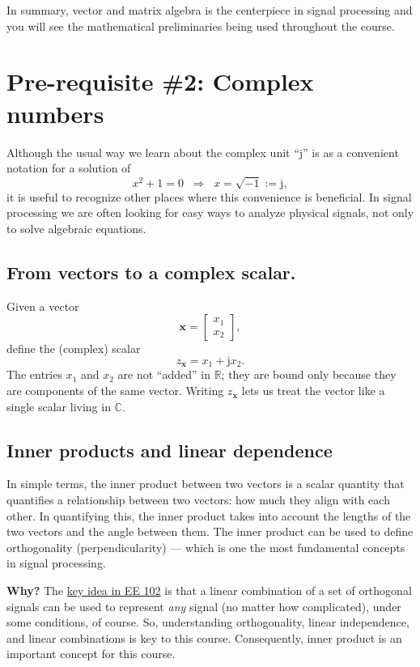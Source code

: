 \documentclass{ee102_notes}
\begin{document}
In summary, vector and matrix algebra is the centerpiece in signal processing and you will see the mathematical preliminaries being used throughout the course.
\section{Pre-requisite \#2: Complex numbers}

Although the usual way we learn about the complex unit ``$\mathrm{j}$'' is as
a convenient notation for a solution of
\[
x^{2}+1=0 \;\;\Rightarrow\;\; x=\sqrt{-1}:=\mathrm{j},
\]
it is useful to recognize other places where this convenience is beneficial.
In signal processing we are often looking for easy ways to analyze physical
signals, not only to solve algebraic equations.

\subsection{From vectors to a complex scalar.}
Given a vector
\[
\mathbf{x}=\begin{bmatrix}x_1\\ x_2\end{bmatrix},
\]
define the (complex) scalar
\[
z_{\mathbf{x}}=x_1+\mathrm{j}x_2.
\]
The entries $x_1$ and $x_2$ are not ``added'' in $\mathbb{R}$; they are bound
only because they are components of the same vector. Writing $z_{\mathbf{x}}$
lets us treat the vector like a single scalar living in $\mathbb{C}$.

\subsection{Inner products and linear dependence}
In simple terms, the inner product between two vectors is a scalar quantity that quantifies a relationship between two vectors: how much they align with each other. In quantifying this, the inner product takes into account the lengths of the two vectors and the angle between them. The inner product can be used to define orthogonality (perpendicularity) --- which is one the most fundamental concepts in signal processing.

\textbf{Why?} The \ul{key idea in EE 102} is that a linear combination of a set of orthogonal signals can be used to represent \textit{any} signal (no matter how complicated), under some conditions, of course. So, understanding orthogonality, linear independence, and linear combinations is key to this course. Consequently, inner product is an important concept for this course.
\end{document}
